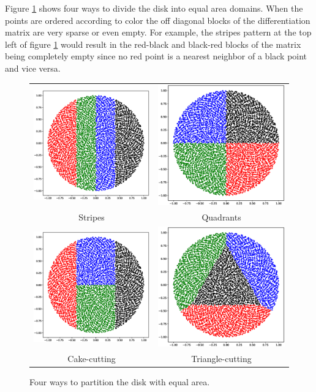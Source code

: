 \documentclass[12pt]{article}
\begin{document}
Figure \ref{decomp_strategies} shows four ways to divide the disk into equal area domains. When the points are ordered according to color the off diagonal blocks of the differentiation matrix are very sparse or even empty. For example, the stripes pattern at the top left of figure \ref{decomp_strategies} would result in the red-black and black-red blocks of the matrix being completely empty since no red point is a nearest neighbor of a black point and vice versa. 

\begin{figure}[t]
	\centering
	\begin{tabular}{cc}
		\includegraphics[width=.4\textwidth]{disk_decomp_strips.eps} & \includegraphics[width=.4\textwidth]{disk_decomp_quad.eps} \\
		Stripes & Quadrants \\
		\includegraphics[width=.4\textwidth]{disk_decomp_cake.eps} & \includegraphics[width=.4\textwidth]{disk_decomp_triangle.eps} \\
		Cake-cutting & Triangle-cutting
	\end{tabular}
	\caption{Four ways to partition the disk with equal area.} \label{decomp_strategies}
\end{figure}
\end{document}

